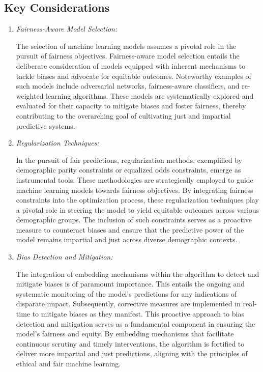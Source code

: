 \documentclass[12pt,a4paper,openright,twoside]{book}
\begin{document}
\subsection{Key Considerations}

\begin{enumerate}

    \item \emph{Fairness-Aware Model Selection:} 
    
    The selection of machine learning models assumes a pivotal role in the pursuit of fairness objectives. Fairness-aware model selection entails the deliberate consideration of models equipped with inherent mechanisms to tackle biases and advocate for equitable outcomes. Noteworthy examples of such models include adversarial networks, fairness-aware classifiers, and re-weighted learning algorithms. These models are systematically explored and evaluated for their capacity to mitigate biases and foster fairness, thereby contributing to the overarching goal of cultivating just and impartial predictive systems.
    
    \item \emph{Regularization Techniques:} 
    
    In the pursuit of fair predictions, regularization methods, exemplified by demographic parity constraints or equalized odds constraints, emerge as instrumental tools. These methodologies are strategically employed to guide machine learning models towards fairness objectives. By integrating fairness constraints into the optimization process, these regularization techniques play a pivotal role in steering the model to yield equitable outcomes across various demographic groups. The inclusion of such constraints serves as a proactive measure to counteract biases and ensure that the predictive power of the model remains impartial and just across diverse demographic contexts.

    \item \emph{Bias Detection and Mitigation:} 
    
    The integration of embedding mechanisms within the algorithm to detect and mitigate biases is of paramount importance. This entails the ongoing and systematic monitoring of the model's predictions for any indications of disparate impact. Subsequently, corrective measures are implemented in real-time to mitigate biases as they manifest. This proactive approach to bias detection and mitigation serves as a fundamental component in ensuring the model's fairness and equity. By embedding mechanisms that facilitate continuous scrutiny and timely interventions, the algorithm is fortified to deliver more impartial and just predictions, aligning with the principles of ethical and fair machine learning.


\end{enumerate}
\end{document}
